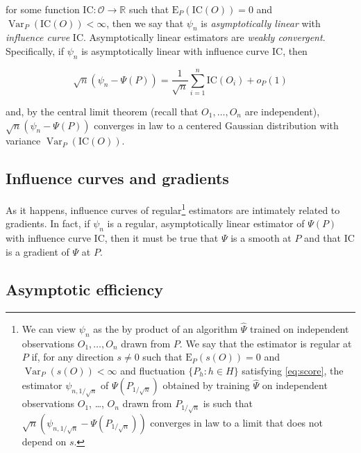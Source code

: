 \documentclass[11pt,openright,twoside]{book}
\DeclareMathOperator{\Var}{Var}
\newcommand{\bbR}{\mathbb{R}}
\newcommand{\calO}{\mathcal{O}}
\newcommand{\Exp}{\textrm{E}}
\newcommand{\IC}{\textrm{IC}}
\newcommand{\Psihat}{\widehat{\Psi}}
\theoremstyle{definition}
\theoremstyle{definition}
\theoremstyle{definition}
\theoremstyle{remark}
\begin{document}
for some function \(\IC : \calO \to \bbR\) such that \(\Exp_P(\IC(O)) = 0\) and
\(\Var_{P}(\IC(O)) < \infty\), then we say that \(\psi_n\) is \emph{asymptotically
linear} with \emph{influence curve} \(\IC\). Asymptotically linear estimators are
\emph{weakly convergent}. Specifically, if \(\psi_n\) is asymptotically linear with
influence curve \(\IC\), then

\begin{equation}
\sqrt{n}  (\psi_n  - \Psi(P))  =  \frac{1}{\sqrt{n}}  \sum_{i=1}^n \IC(O_i)  +
o_P(1) \label{eq:asymp-lin}
\end{equation}

and, by the central limit theorem (recall that \(O_{1}, \ldots, O_{n}\) are
independent), \(\sqrt{n} (\psi_n - \Psi(P))\) converges in law to a centered
Gaussian distribution with variance \(\Var_P(\IC(O))\).

\hypertarget{influence-curves-and-gradients}{%
\subsection{Influence curves and gradients}\label{influence-curves-and-gradients}}

As it happens, influence curves of regular\footnote{We can view \(\psi_{n}\) as the by
  product of an algorithm \(\Psihat\) trained on independent
  observations \(O_{1}, \ldots, O_{n}\) drawn from \(P\). We say that the estimator
  is regular at \(P\) if, for any direction \(s\neq 0\) such that \(\Exp_{P} (s(O)) = 0\) and \(\Var_{P} (s(O)) < \infty\) and fluctuation \(\{P_{h} : h \in H\}\)
  satisfying \eqref{eq:score}, the estimator \(\psi_{n,1/\sqrt{n}}\) of
  \(\Psi(P_{1/\sqrt{n}})\) obtained by training \(\Psihat\) on independent
  observations \(O_{1}\), \ldots, \(O_{n}\) drawn from \(P_{1/\sqrt{n}}\) is such that
  \(\sqrt{n} (\psi_{n,1/\sqrt{n}} - \Psi(P_{1/\sqrt{n}}))\) converges in law to a
  limit that does not depend on \(s\).} estimators are intimately related to
gradients. In fact, if \(\psi_n\) is a regular, asymptotically linear estimator
of \(\Psi(P)\) with influence curve \(\IC\), then it must be true that \(\Psi\) is a
smooth at \(P\) and that \(\IC\) is a gradient of \(\Psi\) at \(P\).

\hypertarget{asymptotic-efficiency}{%
\subsection{Asymptotic efficiency}\label{asymptotic-efficiency}}
\end{document}
